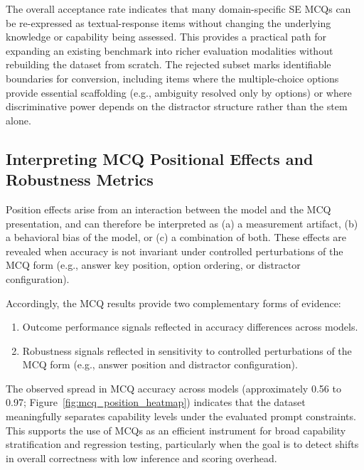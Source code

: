 The overall acceptance rate indicates that many domain-specific SE MCQs can be re-expressed as textual-response items without changing the underlying knowledge or capability being assessed. This provides a practical path for expanding an existing benchmark into richer evaluation modalities without rebuilding the dataset from scratch. The rejected subset marks identifiable boundaries for conversion, including items where the multiple-choice options provide essential scaffolding (e.g., ambiguity resolved only by options) or where discriminative power depends on the distractor structure rather than the stem alone.


\subsection{Interpreting MCQ Positional Effects and Robustness Metrics}

Position effects arise from an interaction between the model and the MCQ presentation, and can therefore be interpreted as (a) a measurement artifact, (b) a behavioral bias of the model, or (c) a combination of both. These effects are revealed when accuracy is not invariant under controlled perturbations of the MCQ form (e.g., answer key position, option ordering, or distractor configuration).

Accordingly, the MCQ results provide two complementary forms of evidence:
\begin{enumerate}[label=(\roman*)]
    \item Outcome performance signals reflected in accuracy differences across models.
    \item Robustness signals reflected in sensitivity to controlled perturbations of the MCQ form (e.g., answer position and distractor configuration).
\end{enumerate}

The observed spread in MCQ accuracy across models (approximately 0.56 to 0.97; Figure~\ref{fig:mcq_position_heatmap}) indicates that the dataset meaningfully separates capability levels under the evaluated prompt constraints. This supports the use of MCQs as an efficient instrument for broad capability stratification and regression testing, particularly when the goal is to detect shifts in overall correctness with low inference and scoring overhead.

